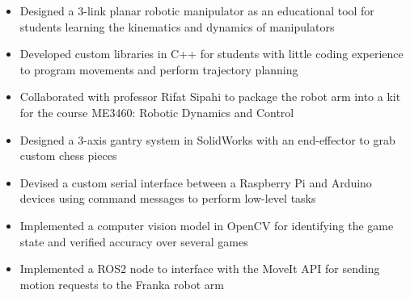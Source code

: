 \documentclass[10pt,a4paper,ragged2e,withhyper]{altacv}
\begin{document}
    \begin{itemize}
        \item Designed a 3-link planar robotic manipulator as an educational tool for students learning the kinematics and dynamics of manipulators
        \item Developed custom libraries in C++ for students with little coding experience to program movements and perform trajectory planning
        \item Collaborated with professor Rifat Sipahi to package the robot arm into a kit for the course ME3460: Robotic Dynamics and Control
    \end{itemize}
    \begin{itemize}
        \item Designed a 3-axis gantry system in SolidWorks with an end-effector to grab custom chess pieces
        \item Devised a custom serial interface between a Raspberry Pi and Arduino devices using command messages to perform low-level tasks
        \item Implemented a computer vision model in OpenCV for identifying the game state and verified accuracy over several games
    \end{itemize}
    \begin{itemize}
        \item Implemented a ROS2 node to interface with the MoveIt API for sending motion requests to the Franka robot arm
    \end{itemize}
    \vspace{-1.55em}
\end{document}
